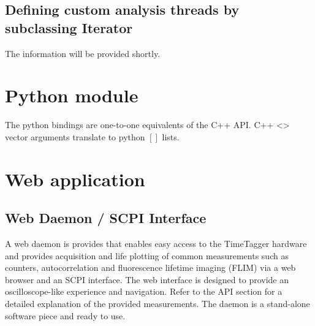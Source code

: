 \documentclass[oneside]{memoir}
\begin{document}
\section{Defining custom analysis threads by subclassing Iterator}

The information will be provided shortly.

\chapter{Python module}

The python bindings are one-to-one equivalents of the C++ API. C++ <> vector
arguments translate to python $[]$ lists. 


\chapter{Web application}\label{sec:WebApplication}

\section{Web Daemon / SCPI Interface}

A web daemon is provides that enables easy access to the TimeTagger hardware and
provides acquisition and life plotting of common measurements such as counters,
autocorrelation and fluorescence lifetime imaging (FLIM) via a web browser
and an SCPI interface. The web interface is designed to provide an oscilloscope-like
experience and navigation. Refer to the API section for a detailed explanation
of the provided measurements. The daemon is a stand-alone software piece and ready to use.

\end{document}
